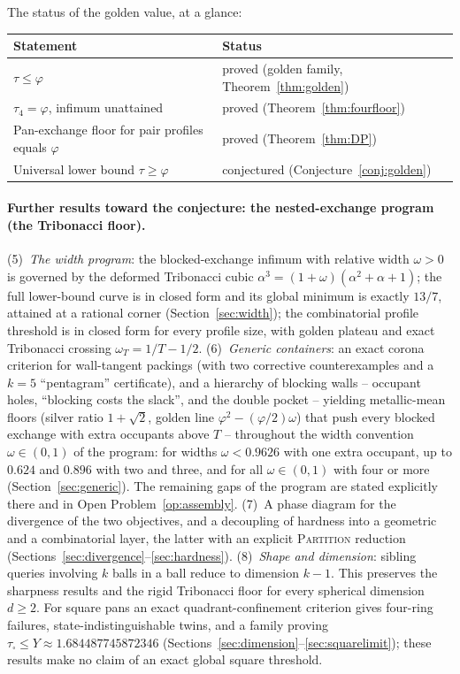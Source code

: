 \documentclass[11pt]{article}
\theoremstyle{definition}
\begin{document}
The status of the golden value, at a glance:
\begin{center}
\begin{tabular}{ll}
\hline
Statement & Status \\
\hline
$\tau\le\varphi$ & proved (golden family, Theorem~\ref{thm:golden}) \\
$\tau_4=\varphi$, infimum unattained & proved
(Theorem~\ref{thm:fourfloor}) \\
Pan-exchange floor for pair profiles equals $\varphi$ & proved
(Theorem~\ref{thm:DP}) \\
Universal lower bound $\tau\ge\varphi$ & conjectured
(Conjecture~\ref{conj:golden}) \\
\hline
\end{tabular}
\end{center}

\paragraph{Further results toward the conjecture: the nested-exchange
program (the Tribonacci floor).}
(5)~\emph{The width program}: the blocked-exchange infimum with relative
width $\omega>0$ is governed by the deformed Tribonacci cubic
$\alpha^3=(1+\omega)(\alpha^2+\alpha+1)$; the full lower-bound curve is in
closed form and its global minimum is exactly $13/7$, attained at a rational
corner (Section~\ref{sec:width}); the combinatorial profile threshold is
in closed form for every profile size, with golden plateau and exact Tribonacci
crossing $\omega_T=1/T-1/2$.
(6)~\emph{Generic containers}: an exact corona criterion for wall-tangent
packings (with two corrective counterexamples and a $k=5$ ``pentagram''
certificate), and a hierarchy of blocking walls -- occupant holes, ``blocking
costs the slack'', and the double pocket -- yielding metallic-mean floors
(silver ratio $1+\sqrt2$, golden line $\varphi^2-(\varphi/2)\omega$) that
push every blocked exchange with extra occupants above $T$ -- throughout
the width convention $\omega\in(0,1)$ of the program: for widths
$\omega<0.9626$ with one extra occupant, up to $0.624$ and $0.896$ with two
and three, and for all $\omega\in(0,1)$ with four or more
(Section~\ref{sec:generic}). The remaining gaps of the program are stated
explicitly there and in Open Problem~\ref{op:assembly}.
(7)~A phase diagram for the divergence of the two objectives, and a
decoupling of hardness into a geometric and a combinatorial layer, the
latter with an explicit \textsc{Partition} reduction
(Sections~\ref{sec:divergence}--\ref{sec:hardness}).
(8)~\emph{Shape and dimension}: sibling queries involving $k$ balls in
a ball reduce to dimension $k-1$. This preserves the sharpness results
and the rigid Tribonacci floor for every spherical dimension $d\ge2$.
For square pans an exact quadrant-confinement criterion gives four-ring
failures, state-indistinguishable twins, and a family proving
$\tau_{\square}\le Y\approx1.684487745872346$
(Sections~\ref{sec:dimension}--\ref{sec:squarelimit}); these results
make no claim of an exact global square threshold.
\end{document}
